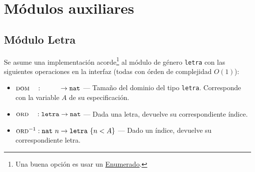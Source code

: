 \section{Módulos auxiliares}
\subsection{Módulo Letra}
Se asume una implementación acorde\footnote{Una buena opción es usar un \href{https://en.wikipedia.org/wiki/Enumerated_type}{Enumerado}.} al módulo de género \texttt{letra} con las siguientes operaciones en la interfaz (todas con órden de complejidad $O(1)$):
\begin{itemize}
    \item $\textsc{dom}\quad :\quad\quad\quad \rightarrow\texttt{nat}$ \---- Tamaño del dominio del tipo \texttt{letra}. Corresponde con la variable $A$ de su especificación.
    \item $\textsc{ord}\quad:\texttt{letra}\rightarrow\texttt{nat}$ \---- Dada una letra, devuelve su correspondiente índice.
    \item $\textsc{ord}^{-1}: \texttt{nat}\ n\rightarrow\texttt{letra}\ \{n < A\}$ \---- Dado un índice, devuelve su correspondiente letra.
\end{itemize}

